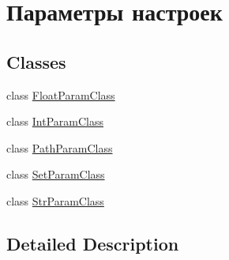 \hypertarget{group___params}{}\section{Параметры настроек}
\label{group___params}
\subsection*{Classes}
\begin{DoxyCompactItemize}
\item 
class \hyperlink{class_float_param_class}{Float\+Param\+Class}
\item 
class \hyperlink{class_int_param_class}{Int\+Param\+Class}
\item 
class \hyperlink{class_path_param_class}{Path\+Param\+Class}
\item 
class \hyperlink{class_set_param_class}{Set\+Param\+Class}
\item 
class \hyperlink{class_str_param_class}{Str\+Param\+Class}
\end{DoxyCompactItemize}


\subsection{Detailed Description}
